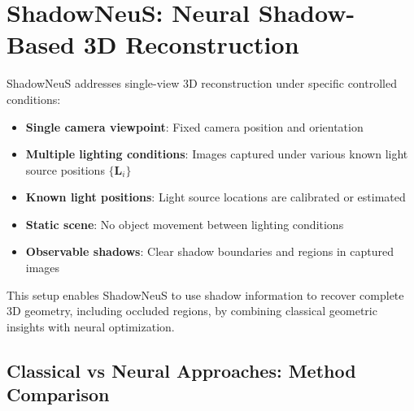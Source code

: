\documentclass[12pt]{article}
\theoremstyle{definition}
\begin{document}




\section{ShadowNeuS: Neural Shadow-Based 3D Reconstruction} \label{sec:shadowneus}

ShadowNeuS addresses single-view 3D reconstruction under specific controlled conditions:

\begin{itemize}
    \item \textbf{Single camera viewpoint}: Fixed camera position and orientation
    \item \textbf{Multiple lighting conditions}: Images captured under various known light source positions $\{\mathbf{L}_i\}$
    \item \textbf{Known light positions}: Light source locations are calibrated or estimated
    \item \textbf{Static scene}: No object movement between lighting conditions
    \item \textbf{Observable shadows}: Clear shadow boundaries and regions in captured images
\end{itemize}

This setup enables ShadowNeuS to use shadow information to recover complete 3D geometry, including occluded regions, by combining classical geometric insights with neural optimization.

\subsection{Classical vs Neural Approaches: Method Comparison} \label{sec:method_comparison}
\end{document}
